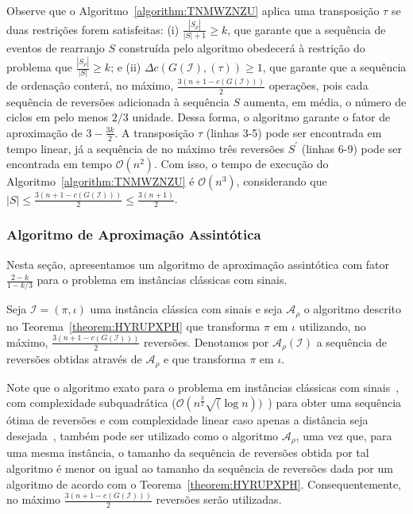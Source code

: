 Observe que o Algoritmo~\ref{algorithm:TNMWZNZU} aplica uma transposição $\tau$ se duas restrições forem satisfeitas: (i) $\frac{|S_{\rho}|}{|S| + 1} \ge k$, que garante que a sequência de eventos de rearranjo $S$ construída pelo algoritmo obedecerá à restrição do problema que $\frac{|S_{\rho}|}{|S|} \ge k$; e (ii) $\Delta c(G(\mathcal{I}), (\tau)) \ge 1$, que garante que a sequência de ordenação conterá, no máximo, $\frac{3(n + 1 -c(G(\mathcal{I})))}{2}$ operações, pois cada sequência de reversões adicionada à sequência $S$ aumenta, em média, o número de ciclos em pelo menos $2/3$ unidade. Dessa forma, o algoritmo garante o fator de aproximação de $3-\frac{3k}{2}$. A transposição $\tau$ (linhas 3-5) pode ser encontrada em tempo linear, já a sequência de no máximo três reversões $S^{\prime}$ (linhas 6-9) pode ser encontrada em tempo $\mathcal{O}(n^2)$. Com isso, o tempo de execução do Algoritmo~\ref{algorithm:TNMWZNZU} é $\mathcal{O}(n^3)$, considerando que $|S| \le \frac{3(n + 1 -c(G(\mathcal{I})))}{2} \le \frac{3({n+1})}{2}$.

\subsubsection{Algoritmo de Aproximação Assintótica}

Nesta seção, apresentamos um algoritmo de aproximação assintótica com fator $\frac{2-k}{1-k/3}$ para o problema \SbPRT{} em instâncias clássicas com sinais.

\begin{definition}
Seja $\mathcal{I} = (\pi,\iota)$ uma instância clássica com sinais e seja $\mathcal{A}_\rho$ o algoritmo descrito no Teorema~\ref{theorem:HYRUPXPH} que transforma $\pi$ em $\iota$ utilizando, no máximo, $\frac{3(n + 1 -c(G(\mathcal{I})))}{2}$ reversões. Denotamos por $\mathcal{A}_\rho(\mathcal{I})$ a sequência de reversões obtidas através de $\mathcal{A}_\rho$ e que transforma $\pi$ em $\iota$.
\end{definition}

Note que o algoritmo exato para o problema \SbR{} em instâncias clássicas com sinais~\cite{1999-hannenhalli-pevzner}, com complexidade subquadrática ($\mathcal{O}(n^{\frac{3}{2}}\sqrt(\log n))$~\cite{2007-tannier-etal}) para obter uma sequência ótima de reversões e com complexidade linear caso apenas a distância seja desejada~\cite{2001-bader-etal}, também pode ser utilizado como o algoritmo $\mathcal{A}_\rho$, uma vez que, para uma mesma instância, o tamanho da sequência de reversões obtida por tal algoritmo é menor ou igual ao tamanho da sequência de reversões dada por um algoritmo de acordo com o Teorema~\ref{theorem:HYRUPXPH}. Consequentemente, no máximo $\frac{3(n + 1 -c(G(\mathcal{I})))}{2}$ reversões serão utilizadas.

